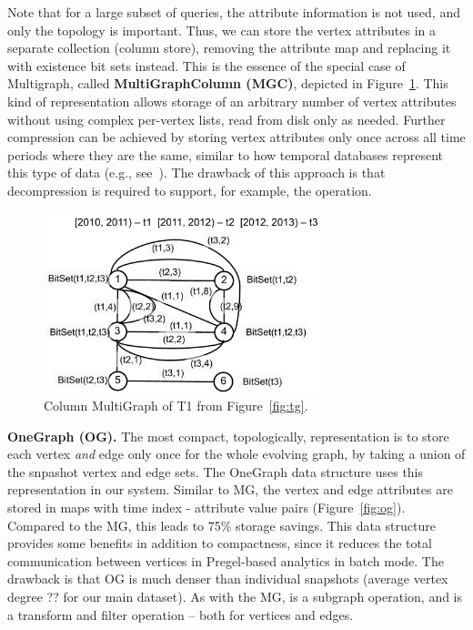 Note that for a large subset of queries, the attribute information is
not used, and only the topology is important.  Thus, we can store the
vertex attributes in a separate collection (column store), removing
the attribute map and replacing it with existence bit sets instead.
This is the essence of the special case of Multigraph, called {\bf
  MultiGraphColumn (MGC)}, depicted in Figure~\ref{fig:mgc}.  This
kind of representation allows storage of an arbitrary number of vertex
attributes without using complex per-vertex lists, read from disk only
as needed.  Further compression can be achieved by storing vertex
attributes only once across all time periods where they are the same,
similar to how temporal databases represent this type of data (e.g.,
see~\cite{Muller2008}).  The drawback of this approach is that
decompression is required to support, for example, the 
operation.

\begin{figure}[t!]
\includegraphics[width=3.2in]{figs/mgc.pdf}
\caption{Column MultiGraph of T1 from Figure~\ref{fig:tg}.}
\label{fig:mgc}
\end{figure}

{\bf OneGraph (OG).}  The most compact, topologically, representation
is to store each vertex {\em and} edge only once for the whole
evolving graph, by taking a union of the snpashot vertex and edge
sets.  The OneGraph data structure uses this representation in our
system.  Similar to MG, the vertex and edge attributes are stored in
maps with time index - attribute value pairs (Figure~\ref{fig:og}).
Compared to the MG, this leads to 75\% storage savings.  This
data structure provides some benefits in addition to compactness,
since it reduces the total communication between vertices in
Pregel-based analytics in batch mode.  The drawback is that OG
 is much denser than
individual snapshots (average vertex degree ??  for our main dataset).
As with the MG,  is a subgraph operation, and
 is a transform and filter operation -- both for
vertices and edges.

